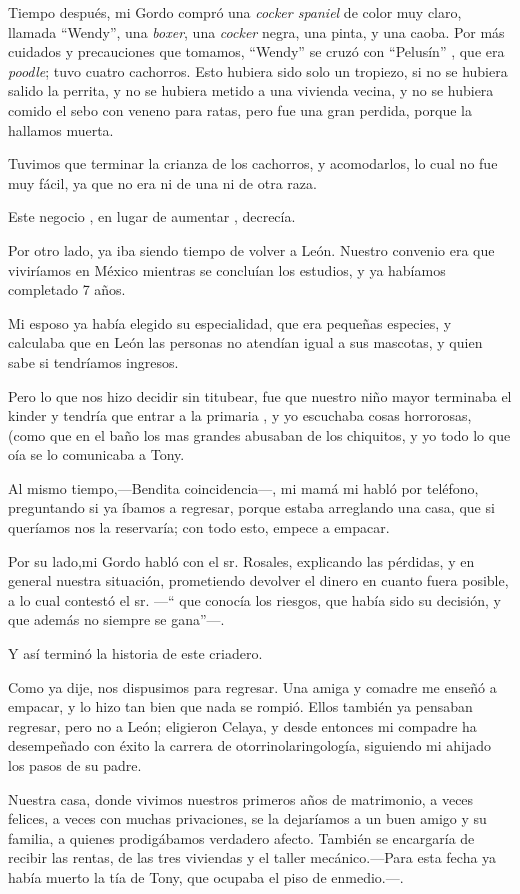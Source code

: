 \documentclass[letterpaper, 12pt]{book}
\begin{document}
Tiempo después, mi Gordo compró una {\it cocker spaniel} de color muy claro, llamada ``Wendy'', una {\it boxer}, una {\it cocker} negra, una pinta, y una caoba. Por más cuidados y precauciones que tomamos, ``Wendy'' se cruzó con ``Pelusín'' , que era {\it poodle}; tuvo cuatro cachorros. Esto hubiera sido solo un tropiezo, si no se hubiera salido la perrita, y no se hubiera metido a una vivienda vecina, y no se hubiera comido el sebo con veneno para ratas, pero fue una gran perdida, porque la hallamos muerta. 

Tuvimos que terminar la crianza de los cachorros, y acomodarlos, lo cual no fue muy fácil, ya que no era ni de una ni de otra raza.

Este negocio , en lugar de aumentar , decrecía.

Por otro lado, ya iba siendo tiempo de volver a León. Nuestro convenio era que viviríamos en México mientras se concluían los estudios, y ya habíamos completado 7 años.

Mi esposo ya había elegido su especialidad, que era pequeñas especies, y calculaba que en León las personas no atendían igual a sus mascotas, y quien sabe si tendríamos ingresos.

Pero lo que nos hizo decidir sin titubear, fue que nuestro niño mayor terminaba el kinder y tendría que entrar a la primaria , y yo escuchaba cosas horrorosas, (como que en el baño los mas grandes abusaban de los chiquitos, y yo todo lo que oía se lo comunicaba a Tony.

Al mismo tiempo,---Bendita coincidencia---, mi mamá mi habló por teléfono, preguntando si ya íbamos a regresar, porque estaba arreglando una casa, que si queríamos nos la reservaría; con todo esto, empece a empacar.

Por su lado,mi Gordo habló con el sr. Rosales, explicando las pérdidas, y en general nuestra situación, prometiendo devolver el dinero en cuanto fuera posible, a lo cual contestó el sr. ---`` que conocía los riesgos, que había  sido su decisión, y que además no siempre se gana''---.

Y así terminó la historia de este criadero.

Como ya dije, nos dispusimos para regresar. Una amiga y comadre me enseñó a empacar, y lo hizo tan bien que nada se rompió. Ellos también ya pensaban regresar, pero no a León; eligieron Celaya, y desde entonces mi compadre ha desempeñado con éxito la carrera de otorrinolaringología, siguiendo mi ahijado los pasos de su padre.

Nuestra casa, donde vivimos nuestros primeros años de matrimonio, a veces felices, a veces con muchas privaciones, se la dejaríamos a un buen amigo y su familia, a quienes prodigábamos verdadero afecto. También se encargaría de recibir las rentas, de las tres viviendas y el taller mecánico.---Para esta fecha ya había muerto la tía de Tony, que ocupaba el piso de enmedio.---.
\end{document}
